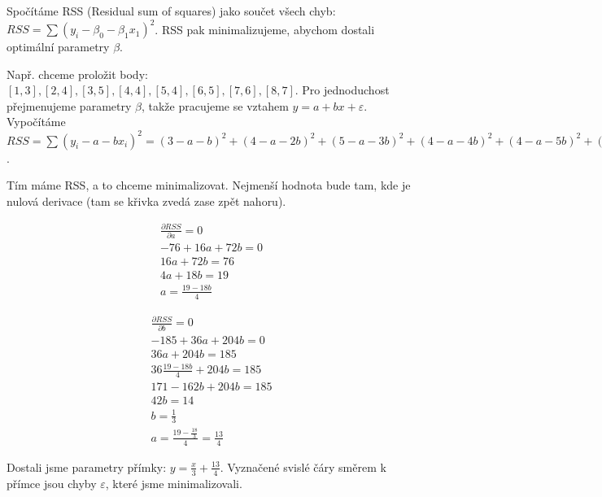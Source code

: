 Spočítáme RSS (Residual sum of squares) jako součet všech chyb: $RSS = \sum (y_i - \beta_0 - \beta_1x_1)^2$. RSS pak minimalizujeme, abychom dostali optimální parametry $\beta$.

Např. chceme proložit body: $[1, 3], [2,4], [3,5], [4, 4], [5,4], [6,5], [7,6], [8,7]$. Pro jednoduchost přejmenujeme parametry $\beta$, takže pracujeme se vztahem $y = a + bx + \varepsilon$. Vypočítáme $RSS = \sum (y_i - a - bx_i)^2 = (3-a-b)^2 + (4-a-2b)^2 + (5-a-3b)^2 + (4-a-4b)^2 + (4-a-5b)^2 + (5-a-6b)^2 + (6-a-7b)^2 + (7-a-8b)^2 = \cdots = 192 - 76a -370b + 8a^2  + 72ab + 204b^2$.

Tím máme RSS, a to chceme minimalizovat. Nejmenší hodnota bude tam, kde je nulová derivace (tam se křivka zvedá zase zpět nahoru).


\begin{minipage}{0.45\textwidth}
\begin{equation}
\begin{split}
\frac{\partial{RSS}}{\partial{a}} = 0 \\
-76 +16a +72b = 0 \\
16a + 72b = 76 \\
4a + 18b = 19 \\
a = \frac{19 - 18b}{4}
\end{split}
\end{equation}
\end{minipage} \hfill
\begin{minipage}{0.45\textwidth}
\begin{equation}
\begin{split}
\frac{\partial{RSS}}{\partial{b}} = 0 \\
-185+36a+204b=0 \\
36a+204b=185 \\
36\frac{19-18b}{4} + 204b = 185 \\
171 -162b+204b = 185 \\
42b = 14\\
b = \frac{1}{3}\\
a = \frac{19-\frac{18}{3}}{4} = \frac{13}{4}
\end{split}
\end{equation}
\end{minipage}

Dostali jsme parametry přímky: $y = \frac{x}{3} + \frac{13}{4}$. Vyznačené svislé čáry směrem k přímce jsou chyby $\varepsilon$, které jsme minimalizovali.

